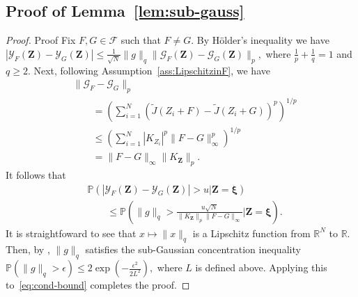 \documentclass[11pt,leqno]{amsart}
\begin{document}
\subsection{Proof of Lemma~\ref{lem:sub-gauss}}
\begin{proof}{Proof}%
Fix $F,G \in \mathcal{F}$ such that $F \neq G$. By H\"older's inequality we have
\(
    |\mathcal{Y}_{F}(\mathbf Z) - \mathcal{Y}_G(\mathbf Z)| \leq \frac{1}{\sqrt{N}} \|g\|_{q} \|\mathcal{G}_F(\mathbf Z) - \mathcal{G}_G (\mathbf Z)\|_{p},
\)
where $\frac{1}{p} + \frac{1}{q} = 1$ and $q \geq 2$. Next, following Assumption~\ref{ass:LipschitzinF}, we have
\begin{align*}
    &\|\mathcal{G}_F - \mathcal{G}_G\|_{p}\\ 
    &\qquad= \left( \sum_{i=1}^N \left(\tilde{J}(Z_i+F) - \tilde{J}(Z_i+G)\right)^p\right)^{1/p}
    \\&\qquad\leq \left( \sum_{i=1}^N \left| K_{Z_i} \right|^p \|F-G\|_{\infty}^p\right)^{1/p}
    \\&\qquad= \|F - G\|_{\infty} \| K_{\mathbf{Z}} \|_{p}.
\end{align*}
It follows that
\begin{align}
\label{eq:cond-bound}
&\mathbb P\left(|\mathcal{Y}_F(\mathbf Z) - \mathcal{Y}_G(\mathbf Z)| > u \bigg| \mathbf{Z} =  \boldsymbol\xi  \right) \\ \nonumber &\qquad\leq \mathbb P\left( \|g\|_{q} > \frac{u \sqrt{N}}{\|K_{\mathbf{Z}}\|_{p} \|F-G\|_{\infty}} \bigg| \mathbf{Z}= \boldsymbol\xi \right).
\end{align}
It is straightfoward to see that $x \mapsto \|x\|_{q}$ is a Lipschitz function from $\mathbb R^N$ to $\mathbb R$. Then, by \citep[Theorem 5.6]{Boucheron}, $\|g\|_{q}$ satisfies the sub-Gaussian concentration inequality
\(
    \mathbb P\left( \|g\|_{q} > \epsilon\right) \leq 2 \exp\left(-\frac{\epsilon^2}{2 L^2} \right),
\)
 where $L$ is defined above. Applying this to~\eqref{eq:cond-bound} completes the proof.
 \end{proof}
\end{document}
